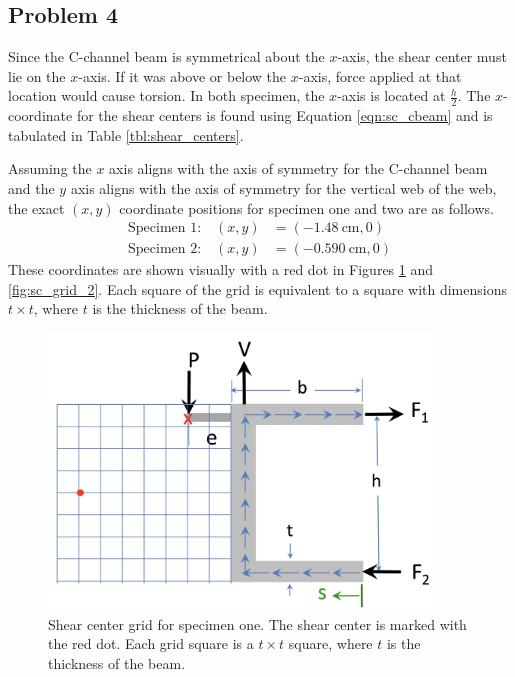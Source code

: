 \documentclass[12 pt]{report}
\begin{document}
\subsection{Problem 4}\label{problem_4}
Since the C-channel beam is symmetrical about the $x$-axis, the shear center must lie on the $x$-axis. If it was above or below the $x$-axis, force applied at that location would cause torsion. In both specimen, the $x$-axis is located at $\frac{h}{2}$. The $x$-coordinate for the shear centers is found using Equation \ref{eqn:sc_cbeam} and is tabulated in Table \ref{tbl:shear_centers}.

Assuming the $x$ axis aligns with the axis of symmetry for the C-channel beam and the $y$ axis aligns with the axis of symmetry for the vertical web of the web, the exact $(x,y)$ coordinate positions for specimen one and two are as follows.
\begin{align*}
	\text{Specimen 1:}\quad(x,y)&=(\qty{-1.48}{\cm},\num{0})\\
	\text{Specimen 2:}\quad(x,y)&=(\qty{-0.590}{\cm},\num{0})
\end{align*}
These coordinates are shown visually with a red dot in Figures \ref{fig:sc_grid_1} and \ref{fig:sc_grid_2}. Each square of the grid is equivalent to a square with dimensions $t\times{}t$, where $t$ is the thickness of the beam.

\begin{figure}[htbp]
	\centering
	\includegraphics[width=4in]{images/shear_center_1}
	\caption{Shear center grid for specimen one. The shear center is marked with the red dot. Each grid square is a $t\times{}t$ square, where $t$ is the thickness of the beam.}
	\label{fig:sc_grid_1}
\end{figure}
\end{document}

